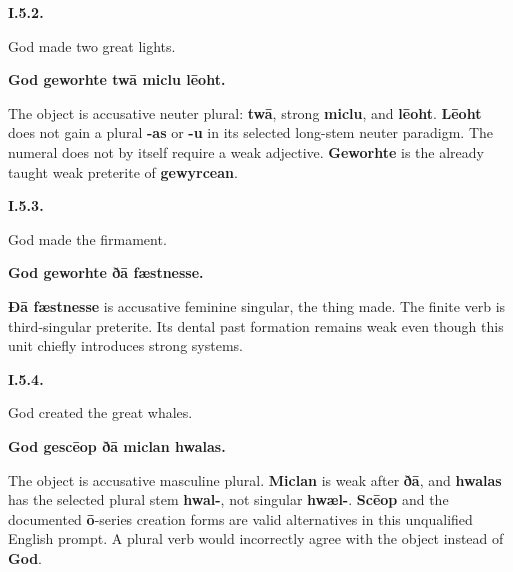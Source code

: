 \par\begin{minipage}{\linewidth}\raggedright
\textbf{I.5.2.}

God made two great lights.

\textbf{God geworhte twā miclu lēoht.}

The object is accusative neuter plural: \textbf{twā}, strong \textbf{miclu}, and \textbf{lēoht}. \textbf{Lēoht} does not gain a plural \textbf{-as} or \textbf{-u} in its selected long-stem neuter paradigm. The numeral does not by itself require a weak adjective. \textbf{Geworhte} is the already taught weak preterite of \textbf{gewyrcean}.

\end{minipage}\par\addvspace{4pt}

\par\begin{minipage}{\linewidth}\raggedright
\textbf{I.5.3.}

God made the firmament.

\textbf{God geworhte ðā fæstnesse.}

\textbf{Ðā fæstnesse} is accusative feminine singular, the thing made. The finite verb is third-singular preterite. Its dental past formation remains weak even though this unit chiefly introduces strong systems.

\end{minipage}\par\addvspace{4pt}

\par\begin{minipage}{\linewidth}\raggedright
\textbf{I.5.4.}

God created the great whales.

\textbf{God gescēop ðā miclan hwalas.}

The object is accusative masculine plural. \textbf{Miclan} is weak after \textbf{ðā}, and \textbf{hwalas} has the selected plural stem \textbf{hwal-}, not singular \textbf{hwæl-}. \textbf{Scēop} and the documented \textbf{ō}-series creation forms are valid alternatives in this unqualified English prompt. A plural verb would incorrectly agree with the object instead of \textbf{God}.

\end{minipage}\par\addvspace{4pt}

